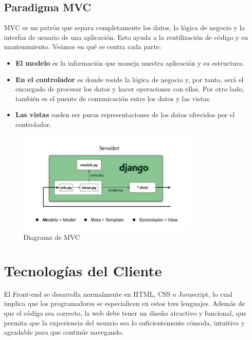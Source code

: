 \subsection*{Paradigma MVC}
MVC es un patrón que separa completamente los datos, la lógica de negocio y la interfaz de usuario de una aplicación. Esto ayuda a la reutilización de código y su mantenimiento.
Veámos en qué se centra cada parte:
\begin{itemize}
\item \textbf {El modelo} es la información que maneja nuestra aplicación y su estructura.
\item \textbf {En el controlador} es donde reside la lógica de negocio y, por tanto, será el encargado de procesar los datos y hacer operaciones con ellos. Por otro lado, también es el puente de comunicación entre los datos y las vistas.
\item \textbf {Las vistas} suelen ser puras representaciones de los datos ofrecidos por el controlador.
\end{itemize}
\begin{figure}[!h]
    \centering
    \includegraphics[width=90mm]{img/introduccion/mvc.png}
    \caption{Diagrama de MVC}
\end{figure}

\section{Tecnologías del Cliente}

El Front-end se desarrolla normalmente en HTML, CSS o Javascript, lo cual implica que los programadores se especialicen en estos tres lenguajes. Además de que el código sea correcto, la web debe tener un diseño atractivo y funcional, que permita que la experiencia del usuario sea lo suficientemente cómoda, intuitiva y agradable para que continúe navegando.

